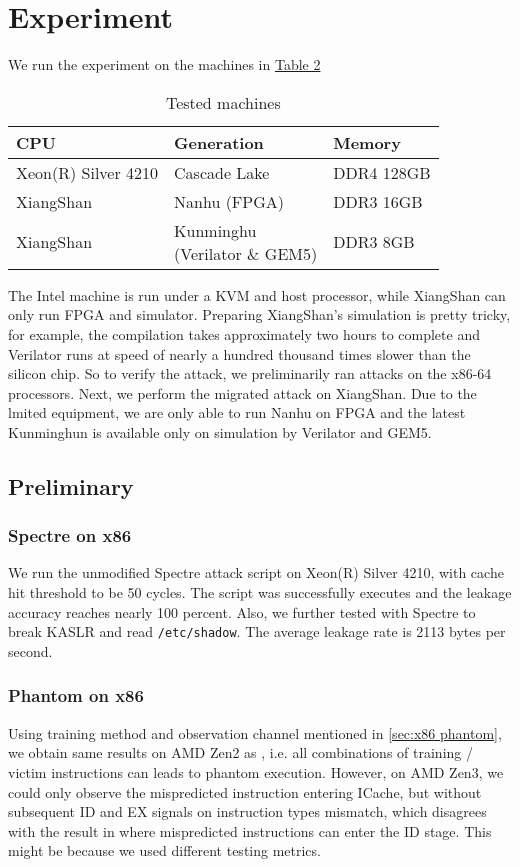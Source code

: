\section{Experiment}

We run the experiment on the machines in \href{tested-machines}{Table 2}

\begin{table}[!htbp]
	\centering
	\begin{tabular}[c]{lll}
		\toprule
        CPU & Generation & Memory \\
		\midrule
        Xeon(R) Silver 4210 & Cascade Lake & DDR4 128GB \\
        XiangShan & Nanhu (FPGA) & DDR3 16GB \\
        XiangShan & \makecell[l]{Kunminghu \\ (Verilator \& GEM5)} & DDR3 8GB \\
		\bottomrule 
	\end{tabular}
    \caption{Tested machines}
    \label{tested-machines}
\end{table}

The Intel machine is run under a KVM and host processor, while XiangShan can only run FPGA and simulator. Preparing XiangShan's simulation is pretty
tricky, for example, the compilation takes approximately two hours to complete and Verilator runs at speed of nearly a hundred thousand times slower than the silicon chip. So to verify the attack, we preliminarily ran attacks on the x86-64 processors. Next, we perform the migrated attack on XiangShan.
Due to the lmited equipment, we are only able to run Nanhu on FPGA and the latest Kunminghun is available only on simulation by Verilator and GEM5.

\subsection{Preliminary}
\subsubsection{Spectre on x86}
We run the unmodified Spectre attack script\cite{spectre} on Xeon(R) Silver 4210, with cache hit threshold to be 50 cycles. The script was successfully
executes and the leakage accuracy reaches nearly 100 percent. Also, we further tested with Spectre to break KASLR and read \verb|/etc/shadow|. The average leakage rate is 2113 bytes per second.

\subsubsection{Phantom on x86}
Using training method and observation channel mentioned in \ref{sec:x86 phantom}, we obtain same results on AMD Zen2 as \cite{phantom}, i.e. all combinations of training / victim instructions can leads to phantom execution. However, on AMD Zen3, we could only observe the mispredicted instruction entering ICache, but without subsequent ID and EX signals on instruction types mismatch, which disagrees with the result in \cite{phantom} where mispredicted instructions can enter the ID stage. This might be because we used different testing metrics.


